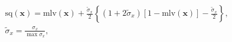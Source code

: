 \documentclass{article}
\begin{document}
\begin{gather}
    \text{sq}(\boldsymbol{x}) = 
    \text{mlv}(\boldsymbol{x}) + 
    \frac{\tilde{\sigma}_{x}}{2}\left\{
        (1 + 2\tilde{\sigma}_{x})[1 - \text{mlv}(\boldsymbol{x})] -
        \frac{\tilde{\sigma}_{x}}{2}
    \right\},\\
    \tilde{\sigma}_{x} = \frac{\sigma_{x}}{\max \sigma_{x}},\\

\end{gather}
\end{document}

